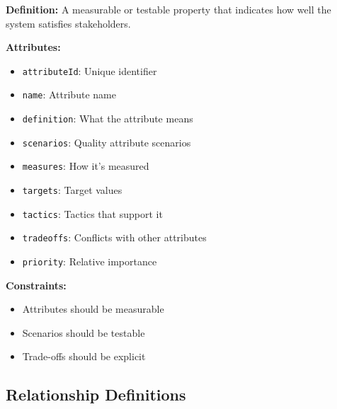 \documentclass[11pt,letterpaper]{article}
\begin{document}
\begin{definitionbox}
\textbf{Definition:} A measurable or testable property that indicates how well the system satisfies stakeholders.

\textbf{Attributes:}
\begin{itemize}[nosep]
    \item \texttt{attributeId}: Unique identifier
    \item \texttt{name}: Attribute name
    \item \texttt{definition}: What the attribute means
    \item \texttt{scenarios}: Quality attribute scenarios
    \item \texttt{measures}: How it's measured
    \item \texttt{targets}: Target values
    \item \texttt{tactics}: Tactics that support it
    \item \texttt{tradeoffs}: Conflicts with other attributes
    \item \texttt{priority}: Relative importance
\end{itemize}

\textbf{Constraints:}
\begin{itemize}[nosep]
    \item Attributes should be measurable
    \item Scenarios should be testable
    \item Trade-offs should be explicit
\end{itemize}
\end{definitionbox}

\subsection{Relationship Definitions}
\end{document}
